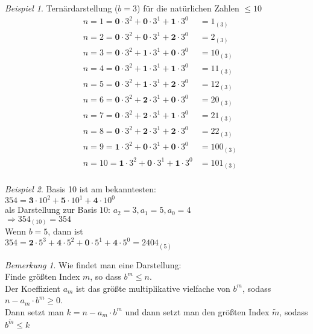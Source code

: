\documentclass[12pt,a4paper,titlepage]{article} %
\theoremstyle{definition}
\theoremstyle{remark}
\newtheorem*{bem}{Bemerkung}
\newtheorem*{bsp}{Beispiel}
\begin{document}
	\begin{bsp}
		Ternärdarstellung (\(b = 3\)) für die natürlichen Zahlen \(\leq 10\)\\
		\begin{align*}
			&n = 1 = \textbf{0} \cdot 3^2 + \textbf{0} \cdot 3^1 + \textbf{1} \cdot 3^0 &= 1_{(3)}\\
			&n = 2 = \textbf{0} \cdot 3^2 + \textbf{0} \cdot 3^1 + \textbf{2} \cdot 3^0 &= 2_{(3)}\\
			&n = 3 = \textbf{0} \cdot 3^2 + \textbf{1} \cdot 3^1 + \textbf{0} \cdot 3^0 &= 10_{(3)}\\
			&n = 4 = \textbf{0} \cdot 3^2 + \textbf{1} \cdot 3^1 + \textbf{1} \cdot 3^0 &= 11_{(3)}\\
			&n = 5 = \textbf{0} \cdot 3^2 + \textbf{1} \cdot 3^1 + \textbf{2} \cdot 3^0 &= 12_{(3)}\\
			&n = 6 = \textbf{0} \cdot 3^2 + \textbf{2} \cdot 3^1 + \textbf{0} \cdot 3^0 &= 20_{(3)}\\
			&n = 7 = \textbf{0} \cdot 3^2 + \textbf{2} \cdot 3^1 + \textbf{1} \cdot 3^0 &= 21_{(3)}\\
			&n = 8 = \textbf{0} \cdot 3^2 + \textbf{2} \cdot 3^1 + \textbf{2} \cdot 3^0 &= 22_{(3)}\\
			&n = 9 = \textbf{1} \cdot 3^2 + \textbf{0} \cdot 3^1 + \textbf{0} \cdot 3^0 &= 100_{(3)}\\
			&n = 10 = \textbf{1} \cdot 3^2 + \textbf{0} \cdot 3^1 + \textbf{1} \cdot 3^0 &= 101_{(3)}\\
		\end{align*}
	\end{bsp}
	\begin{bsp}
		Basis 10 ist am bekanntesten:\\
		\(354 = \textbf{3} \cdot 10^2 + \textbf{5} \cdot 10^1 + \textbf{4} \cdot 10^0\)\\
		als Darstellung zur Basis \(10\): \(a_2 = 3, a_1 = 5, a_0 = 4\)\\
		\(\Rightarrow 354_{(10)} = 354\)\\
		Wenn \(b = 5\), dann ist\\
		\(354 = \textbf{2} \cdot 5^3 + \textbf{4} \cdot 5^2 + \textbf{0} \cdot 5^1 + \textbf{4} \cdot 5^0 = 2404_{(5)}\)
	\end{bsp}
	\begin{bem} %
		Wie findet man eine Darstellung:\\
		Finde größten Index \(m\), so dass \(b^m \leq n\).\\
		Der Koeffizient \(a_m\) ist das größte multiplikative vielfache von \(b^m\), sodass \(n - a_m \cdot b^m \geq 0\).\\
		Dann setzt man \(k=n-a_m \cdot b^m\) und dann setzt man den größten Index \(\tilde{m}\), sodass \(b^{\tilde{m}} \leq k\)
	\end{bem}
\end{document}
